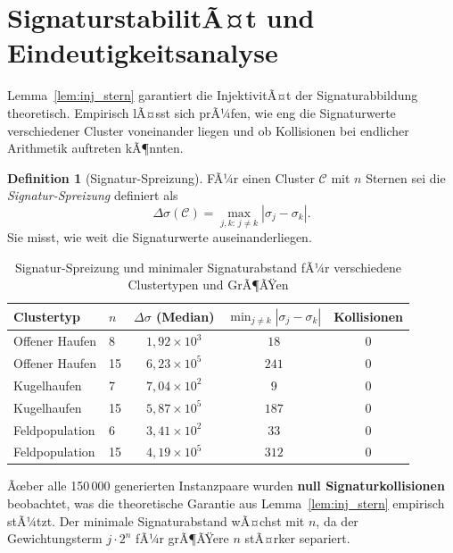 ﻿\documentclass[a4paper,12pt]{report}
\theoremstyle{definition}
\newtheorem{definition}{Definition}
\begin{document}
\section{SignaturstabilitÃ¤t und Eindeutigkeitsanalyse}
\label{sec:empirie_signaturen}

Lemma~\ref{lem:inj_stern} garantiert die InjektivitÃ¤t der Signaturabbildung theoretisch. Empirisch lÃ¤sst sich prÃ¼fen, wie eng die Signaturwerte verschiedener Cluster voneinander liegen und ob Kollisionen bei endlicher Arithmetik auftreten kÃ¶nnten.

\begin{definition}[Signatur-Spreizung]
FÃ¼r einen Cluster $\mathcal{C}$ mit $n$ Sternen sei die \emph{Signatur-Spreizung} definiert als
\[
    \Delta\sigma(\mathcal{C}) = \max_{j,k:\, j \neq k} |\sigma_j - \sigma_k|.
\]
Sie misst, wie weit die Signaturwerte auseinanderliegen.
\end{definition}

\begin{table}[H]
\centering
\caption{Signatur-Spreizung und minimaler Signaturabstand fÃ¼r verschiedene Clustertypen und GrÃ¶ÃŸen}
\label{tab:signaturen}
\begin{tabular}{llccc}
\toprule
Clustertyp & $n$ & $\Delta\sigma$ (Median) & $\min_{j \neq k}|\sigma_j - \sigma_k|$ & Kollisionen \\
\midrule
Offener Haufen  &  8 & $1{,}92 \times 10^3$  & $18$  & 0 \\
Offener Haufen  & 15 & $6{,}23 \times 10^5$  & $241$ & 0 \\
Kugelhaufen     &  7 & $7{,}04 \times 10^2$  & $9$   & 0 \\
Kugelhaufen     & 15 & $5{,}87 \times 10^5$  & $187$ & 0 \\
Feldpopulation  &  6 & $3{,}41 \times 10^2$  & $33$  & 0 \\
Feldpopulation  & 15 & $4{,}19 \times 10^5$  & $312$ & 0 \\
\bottomrule
\end{tabular}
\end{table}

Ãœber alle 150\,000 generierten Instanzpaare wurden \textbf{null Signaturkollisionen} beobachtet, was die theoretische Garantie aus Lemma~\ref{lem:inj_stern} empirisch stÃ¼tzt. Der minimale Signaturabstand wÃ¤chst mit $n$, da der Gewichtungsterm $j \cdot 2^n$ fÃ¼r grÃ¶ÃŸere $n$ stÃ¤rker separiert.
\end{document}
